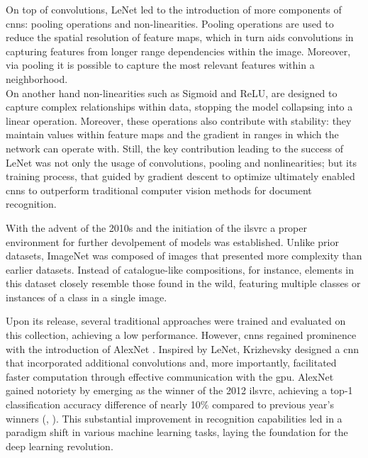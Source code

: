 \noindent On top of convolutions, LeNet led to the introduction of more components of \glspl{cnn}: 
pooling operations and non-linearities. Pooling operations are used to reduce the spatial 
resolution of feature maps, which in turn aids convolutions in capturing features from longer 
range dependencies within the image. Moreover, via pooling it is possible to capture the most 
relevant features within a neighborhood.\\
On another hand non-linearities such as Sigmoid and ReLU, are designed to capture complex 
relationships within data, stopping the model collapsing into a linear operation. Moreover, these 
operations also contribute with stability: they maintain values within feature maps and the gradient 
in ranges in which the network can operate with. %
Still, the key contribution leading to the success of LeNet was not only the usage of 
convolutions, pooling and nonlinearities; but its training process, that guided by gradient descent 
to optimize ultimately enabled \glspl{cnn} to outperform traditional computer vision methods for 
document recognition. 



\noindent With the advent of the 2010s and the initiation of the \gls{ilsvrc} \autocite{ILSVRC15} 
a proper environment for further devolpement of models was established. Unlike prior datasets, 
ImageNet was composed of images that presented more complexity than earlier datasets. Instead 
of catalogue-like compositions, for instance, elements in this dataset closely resemble those found 
in the wild, featuring multiple classes or instances of a class in a single image.

Upon its release, several traditional approaches were trained and evaluated on this collection, 
achieving a low performance. However, \glspl{cnn} regained prominence with the introduction of
AlexNet \autocite{krizhevsky2012imagenet}. Inspired by LeNet, Krizhevsky designed a 
\gls{cnn} that incorporated additional convolutions and, more importantly, facilitated faster 
computation through effective communication with the \gls{gpu}.
AlexNet gained notoriety by emerging as the winner of the 2012 \gls{ilsvrc}, achieving a top-1 
classification accuracy difference of nearly 10\% compared to previous year's winners 
(\cite{berg2010large}, \cite{sanchez2011high}). This substantial improvement in recognition 
capabilities led in a paradigm shift in various machine learning tasks, laying the foundation 
for the deep learning revolution.\\

